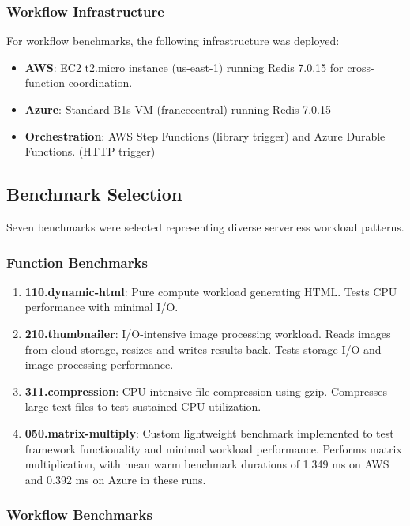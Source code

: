 \documentclass[sigconf,nonacm]{acmart}
\begin{document}
\subsubsection{Workflow Infrastructure}

For workflow benchmarks, the following infrastructure was deployed:
\begin{itemize}
    \item \textbf{AWS}: EC2 t2.micro instance (us-east-1) running Redis 7.0.15 for cross-function coordination.
    \item \textbf{Azure}: Standard B1s VM (francecentral) running Redis 7.0.15
    \item \textbf{Orchestration}: AWS Step Functions (library trigger) and Azure Durable Functions. (HTTP trigger)
\end{itemize}

\subsection{Benchmark Selection}

Seven benchmarks were selected representing diverse serverless workload patterns.

\subsubsection{Function Benchmarks}

\begin{enumerate}
    \item \textbf{110.dynamic-html}: Pure compute workload generating HTML. Tests CPU performance with minimal I/O.
    \item \textbf{210.thumbnailer}: I/O-intensive image processing workload. Reads images from cloud storage, resizes and writes results back. Tests storage I/O and image processing performance.
    \item \textbf{311.compression}: CPU-intensive file compression using gzip. Compresses large text files to test sustained CPU utilization.
    \item \textbf{050.matrix-multiply}: Custom lightweight benchmark implemented to test framework functionality and minimal workload performance. Performs matrix multiplication, with mean warm benchmark durations of 1.349 ms on AWS and 0.392 ms on Azure in these runs.
\end{enumerate}

\subsubsection{Workflow Benchmarks}
\end{document}

